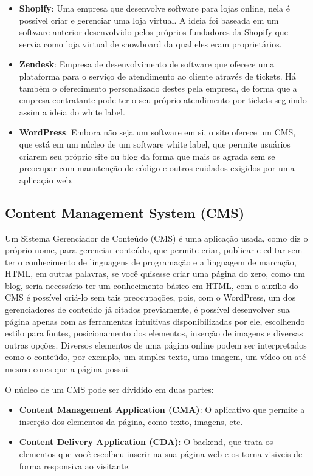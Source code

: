 \begin{itemize}
    \item {\bfseries Shopify}: Uma empresa que desenvolve software para lojas online, nela é possível criar e gerenciar uma loja virtual. A ideia foi baseada em um software anterior desenvolvido pelos próprios fundadores da Shopify que servia como loja virtual de snowboard da qual eles eram proprietários.

    \item {\bfseries Zendesk}: Empresa de desenvolvimento de software que oferece uma plataforma para o serviço de atendimento ao cliente através de tickets. Há também o oferecimento personalizado destes pela empresa, de forma que a empresa contratante pode ter o seu próprio atendimento por tickets seguindo assim a ideia do white label.

    \item {\bfseries WordPress}: Embora não seja um software em si, o site oferece um CMS, que está em um núcleo de um software white label, que permite usuários criarem seu próprio site ou blog da forma que mais os agrada sem se preocupar com manutenção de código e outros cuidados exigidos por uma aplicação web.
\end{itemize}

\subsection{Content Management System (CMS)}
Um Sistema Gerenciador de Conteúdo (CMS) é uma aplicação usada, como diz o próprio nome, para gerenciar conteúdo, que permite criar, publicar e editar sem ter o conhecimento de linguagens de programação e a linguagem de marcação, HTML, em outras palavras, se você quisesse criar uma página do zero, como um blog, seria necessário ter um conhecimento básico em HTML, com o auxílio do CMS é possível criá-lo sem tais preocupações, pois, com o WordPress, um dos gerenciadores de conteúdo já citados previamente, é possível desenvolver sua página apenas com as ferramentas intuitivas disponibilizadas por ele, escolhendo estilo para fontes, posicionamento dos elementos, inserção de imagens e diversas outras opções. Diversos elementos de uma página online podem ser interpretados como o conteúdo, por exemplo, um simples texto, uma imagem, um vídeo ou até mesmo cores que a página possui.

O núcleo de um CMS pode ser dividido em duas partes:
\begin{itemize}
    \item {\bfseries Content Management Application (CMA)}: O aplicativo que permite a inserção dos elementos da página, como texto, imagens, etc.

    \item {\bfseries Content Delivery Application (CDA)}: O backend, que trata os elementos que você escolheu inserir na sua página web e os torna visiveis de forma responsiva ao visitante.
\end{itemize}

